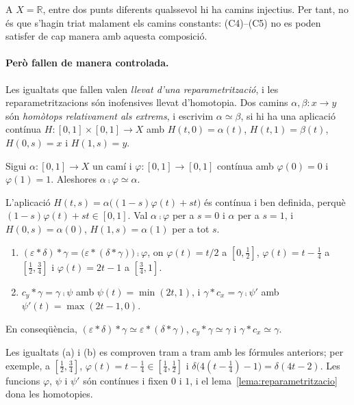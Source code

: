 A $X=\mathbb R$, entre dos punts diferents qualssevol hi ha camins injectius. Per tant, no és que s'hagin triat malament els camins constants: (C4)--(C5) no es poden satisfer de cap manera amb aquesta composició.

\paragraph{Però fallen de manera controlada.} Les igualtats que fallen valen \emph{llevat d'una reparametrització}, i les reparametritzacions són inofensives llevat d'homotopia. Dos camins $\alpha,\beta\colon x\to y$ són \emph{homòtops relativament als extrems}, i escrivim $\alpha\simeq\beta$, si hi ha una aplicació contínua $H\colon[0,1]\times[0,1]\to X$ amb $H(t,0)=\alpha(t)$, $H(t,1)=\beta(t)$, $H(0,s)=x$ i $H(1,s)=y$.

\begin{lema}[Reparametrització]\label{lema:reparametritzacio}
Sigui $\alpha\colon[0,1]\to X$ un camí i $\varphi\colon[0,1]\to[0,1]$ contínua amb $\varphi(0)=0$ i $\varphi(1)=1$. Aleshores $\alpha\comp\varphi\simeq\alpha$.
\end{lema}

\begin{prova}
L'aplicació $H(t,s)=\alpha\bigl((1-s)\varphi(t)+st\bigr)$ és contínua i ben definida, perquè $(1-s)\varphi(t)+st\in[0,1]$. Val $\alpha\comp\varphi$ per a $s=0$ i $\alpha$ per a $s=1$, i $H(0,s)=\alpha(0)$, $H(1,s)=\alpha(1)$ per a tot $s$.
\end{prova}

\begin{proposicio}\label{prop:associador-camins}
\begin{enumerate}
\item[(a)] $(\varepsilon\ast\delta)\ast\gamma=\bigl(\varepsilon\ast(\delta\ast\gamma)\bigr)\comp\varphi$, on $\varphi(t)=t/2$ a $[0,\frac12]$, $\varphi(t)=t-\frac14$ a $[\frac12,\frac34]$ i $\varphi(t)=2t-1$ a $[\frac34,1]$.
\item[(b)] $c_y\ast\gamma=\gamma\comp\psi$ amb $\psi(t)=\min(2t,1)$, i $\gamma\ast c_x=\gamma\comp\psi'$ amb $\psi'(t)=\max(2t-1,0)$.
\end{enumerate}
En conseqüència, $(\varepsilon\ast\delta)\ast\gamma\simeq\varepsilon\ast(\delta\ast\gamma)$, $c_y\ast\gamma\simeq\gamma$ i $\gamma\ast c_x\simeq\gamma$.
\end{proposicio}

\begin{prova}
Les igualtats (a) i (b) es comproven tram a tram amb les fórmules anteriors; per exemple, a $[\frac12,\frac34]$, $\varphi(t)=t-\frac14\in[\frac14,\frac12]$ i $\delta\bigl(4(t-\frac14)-1\bigr)=\delta(4t-2)$. Les funcions $\varphi$, $\psi$ i $\psi'$ són contínues i fixen $0$ i $1$, i el lema~\ref{lema:reparametritzacio} dona les homotopies.
\end{prova}


